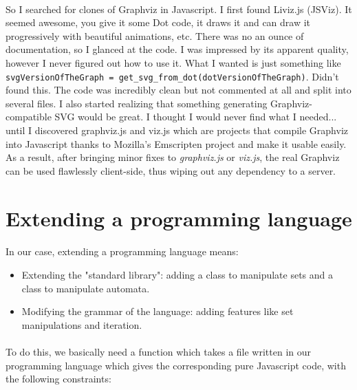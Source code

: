 \documentclass{article}
\begin{document}
\begin{sloppypar}
\paragraph{}
So I searched for clones of Graphviz in Javascript. I first found Liviz.js (JSViz). It seemed awesome, you give it some Dot code, it draws it and can draw it progressively with beautiful animations, etc. There was no an ounce of documentation, so I glanced at the code. I was impressed by its apparent quality, however I never figured out how to use it. What I wanted is just something like \lstinline!svgVersionOfTheGraph = get_svg_from_dot(dotVersionOfTheGraph)!. Didn't found this. The code was incredibly clean but not commented at all and split into several files. I also started realizing that something generating Graphviz-compatible SVG would be great. I thought I would never find what I needed... until I discovered graphviz.js and viz.js which are projects that compile Graphviz into Javascript thanks to Mozilla's Emscripten project and make it usable easily. As a result, after bringing minor fixes to {\itshape graphviz.js} or {\itshape viz.js}, the real Graphviz can be used flawlessly client-side, thus wiping out any dependency to a server.




\section{ Extending a programming language}


\paragraph{}
In our case, extending a programming language means:
    
\begin{itemize}
	\item{ Extending the "standard library": adding a class to manipulate sets and a class to manipulate automata.}
	\item{ Modifying the grammar of the language: adding features like set manipulations and iteration.}
\end{itemize}

\paragraph{}
To do this, we basically need a function which takes a file written in our programming language which gives the corresponding pure Javascript code, with the following constraints:
    

\end{sloppypar}
\end{document}
